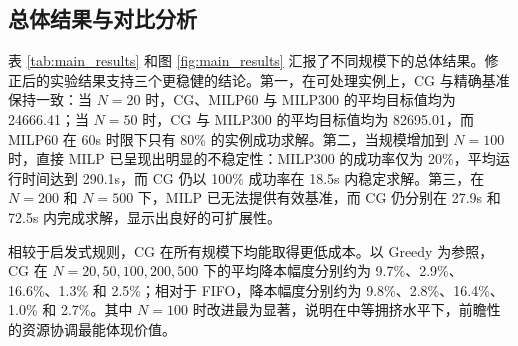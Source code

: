 \subsection{总体结果与对比分析}
\label{sec:overall_results_excerpt}

表 \ref{tab:main_results} 和图 \ref{fig:main_results} 汇报了不同规模下的总体结果。修正后的实验结果支持三个更稳健的结论。第一，在可处理实例上，CG 与精确基准保持一致：当 $N=20$ 时，CG、MILP60 与 MILP300 的平均目标值均为 24666.41；当 $N=50$ 时，CG 与 MILP300 的平均目标值均为 82695.01，而 MILP60 在 60s 时限下只有 80\% 的实例成功求解。第二，当规模增加到 $N=100$ 时，直接 MILP 已呈现出明显的不稳定性：MILP300 的成功率仅为 20\%，平均运行时间达到 290.1s，而 CG 仍以 100\% 成功率在 18.5s 内稳定求解。第三，在 $N=200$ 和 $N=500$ 下，MILP 已无法提供有效基准，而 CG 仍分别在 27.9s 和 72.5s 内完成求解，显示出良好的可扩展性。

相较于启发式规则，CG 在所有规模下均能取得更低成本。以 Greedy 为参照，CG 在 $N=20,50,100,200,500$ 下的平均降本幅度分别约为 9.7\%、2.9\%、16.6\%、1.3\% 和 2.5\%；相对于 FIFO，降本幅度分别约为 9.8\%、2.8\%、16.4\%、1.0\% 和 2.7\%。其中 $N=100$ 时改进最为显著，说明在中等拥挤水平下，前瞻性的资源协调最能体现价值。
